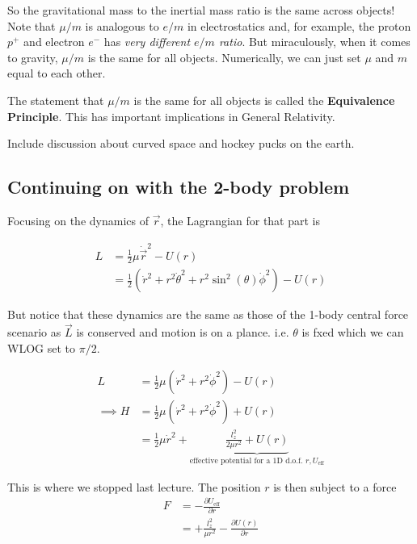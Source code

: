 \documentclass[11pt]{article}
\begin{document}
So the gravitational mass to the inertial mass ratio is the same across objects! Note that $\mu/m$ is analogous to $e/m$ in electrostatics and, for example, the proton $p^+$ and electron $e^-$ has \emph{very different $e/m$ ratio}. But miraculously, when it comes to gravity, $\mu / m$ is the same for all objects. Numerically, we can just set $\mu$ and $m$ equal to each other. 


\begin{bluebox}
  The statement that $\mu / m$ is the same for all objects is called the \textbf{Equivalence Principle}. This has important implications in General Relativity.
\end{bluebox}

\begin{redbox}
  Include discussion about curved space and hockey pucks on the earth.
\end{redbox}

\subsection{Continuing on with the 2-body problem}

Focusing on the dynamics of $\vec{r}$, the Lagrangian for that part is 

\begin{align*}
  L &= \frac{1}{2}\mu \dot{\vec{r}}^2 - U(r) \\
  &= \frac{1}{2} \left( \dot{r}^2 + r^2 \dot{\theta}^2 + r^2 \sin^2(\theta) \dot{\phi}^2 \right) - U(r)
\end{align*}

But notice that these dynamics are the same as those of the 1-body central force scenario as $\vec{L}$ is conserved and motion is on a plance. i.e. $\theta$ is fxed which we can WLOG set to $\pi/2$.

\begin{align*}
  L &= \frac{1}{2} \mu \left( \dot{r}^2 + r^2 \dot{\phi}^2 \right) - U(r) \\
  \implies H &= \frac{1}{2} \mu \left(\dot{r}^2 + r^2 \dot{\phi}^2\right) + U(r) \\
  &= \frac{1}{2} \mu \dot{r}^2 + \underbrace{\frac{l_z^2}{2\mu r^2} + U(r)}_{\text{effective potential for a 1D d.o.f. } r, U_{\text{eff}}}
\end{align*}

This is where we stopped last lecture. The position $r$ is then subject to a force 
\begin{align*}
  F &= - \frac{\partial U_{\text{eff}}}{\partial r} \\
  &= +\frac{l_{z}^{2}}{\mu r^2} - \frac{\partial U(r)}{\partial r}
\end{align*}
\end{document}
